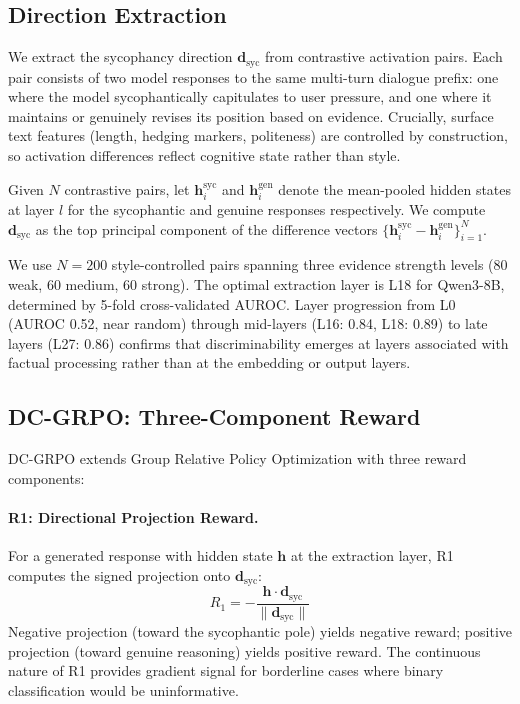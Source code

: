 \documentclass[11pt]{article}
\begin{document}
\subsection{Direction Extraction}
\label{sec:direction}

We extract the sycophancy direction $\mathbf{d}_\text{syc}$ from contrastive activation pairs. Each pair consists of two model responses to the same multi-turn dialogue prefix: one where the model sycophantically capitulates to user pressure, and one where it maintains or genuinely revises its position based on evidence. Crucially, surface text features (length, hedging markers, politeness) are controlled by construction, so activation differences reflect cognitive state rather than style.

Given $N$ contrastive pairs, let $\mathbf{h}_i^{\text{syc}}$ and $\mathbf{h}_i^{\text{gen}}$ denote the mean-pooled hidden states at layer $l$ for the sycophantic and genuine responses respectively. We compute $\mathbf{d}_\text{syc}$ as the top principal component of the difference vectors $\{\mathbf{h}_i^{\text{syc}} - \mathbf{h}_i^{\text{gen}}\}_{i=1}^N$.

We use $N=200$ style-controlled pairs spanning three evidence strength levels (80 weak, 60 medium, 60 strong). The optimal extraction layer is L18 for Qwen3-8B, determined by 5-fold cross-validated AUROC. Layer progression from L0 (AUROC 0.52, near random) through mid-layers (L16: 0.84, L18: 0.89) to late layers (L27: 0.86) confirms that discriminability emerges at layers associated with factual processing rather than at the embedding or output layers.

\subsection{DC-GRPO: Three-Component Reward}

DC-GRPO extends Group Relative Policy Optimization with three reward components:

\paragraph{R1: Directional Projection Reward.}
For a generated response with hidden state $\mathbf{h}$ at the extraction layer, R1 computes the signed projection onto $\mathbf{d}_\text{syc}$:
\begin{equation}
    R_1 = -\frac{\mathbf{h} \cdot \mathbf{d}_\text{syc}}{\|\mathbf{d}_\text{syc}\|}
\end{equation}
Negative projection (toward the sycophantic pole) yields negative reward; positive projection (toward genuine reasoning) yields positive reward. The continuous nature of R1 provides gradient signal for borderline cases where binary classification would be uninformative.
\end{document}
